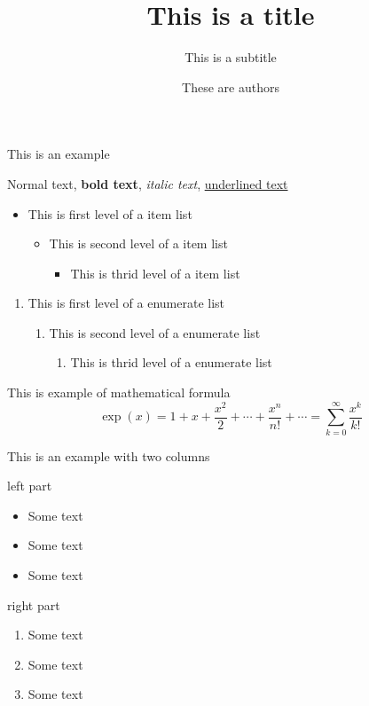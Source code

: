 \documentclass[aspectratio=169]{beamer}
\title{This is a title}
\subtitle{This is a subtitle}
\author{These are authors}
\begin{document}
\begin{frame}
\titlepage
\end{frame}

\begin{frame}{This is an example}

Normal text, \textbf{bold text}, \textit{italic text}, \underline{underlined text}
\vfill
\begin{itemize}
    \item This is first level of a item list
    \begin{itemize}
        \item This is second level of a item list
        \begin{itemize}
            \item This is thrid level of a item list
        \end{itemize}
    \end{itemize}
\end{itemize}
\vfill
\begin{enumerate}
    \item This is first level of a enumerate list
    \begin{enumerate}
        \item This is second level of a enumerate list
        \begin{enumerate}
            \item This is thrid level of a enumerate list
        \end{enumerate}
    \end{enumerate}
\end{enumerate}
\vfill
This is example of mathematical formula
\[
    \exp(x) = 1 + x + \frac{x^2}{2}  + \cdots + \frac{x^n}{n!} + \cdots = \sum_{k=0}^\infty \frac{x^k}{k!}
\]

\end{frame}

\begin{frame}{This is an example with two columns}
    \begin{minipage}[t]{0.49\linewidth}
        left part
        
        \begin{itemize}
            \item Some text
            \item Some text
            \item Some text
        \end{itemize}
    \end{minipage}
    \hfill
    \begin{minipage}[t]{0.49\linewidth}
        right part
        \begin{enumerate}
            \item Some text
            \item Some text
            \item Some text
        \end{enumerate}
    \end{minipage}
\end{frame}
\end{document}
